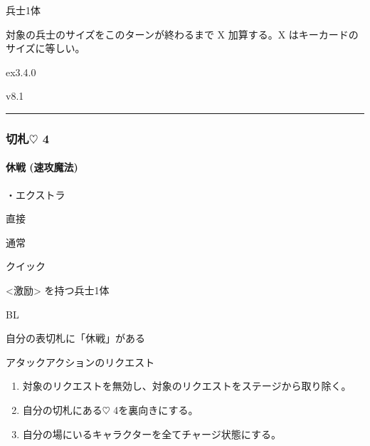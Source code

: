 \documentclass[letterpaper,10pt,dvipdfmx]{sphinxmanual}
\begin{document}
\sphinxAtStartPar
兵士1体

\sphinxAtStartPar
{}

\sphinxAtStartPar
対象の兵士のサイズをこのターンが終わるまで X 加算する。X はキーカードのサイズに等しい。

\sphinxAtStartPar
{}  ex3.4.0

\sphinxAtStartPar
{}  v8.1


\bigskip\hrule\bigskip



\subsubsection{切札{\normalsize $\heartsuit$} 4}
\label{\detokenize{auto/frameActionlist:id37}}

\paragraph{休戦 (速攻魔法)}
\label{\detokenize{auto/frameActionlist:act-retreat}}\label{\detokenize{auto/frameActionlist:id38}}
\sphinxAtStartPar
{}

\sphinxAtStartPar
・エクストラ

\sphinxAtStartPar
{} 直接

\sphinxAtStartPar
{} 通常

\sphinxAtStartPar
{} クイック

\sphinxAtStartPar
{} \textless{}激励\textgreater{} を持つ兵士1体

\sphinxAtStartPar
{} BL

\sphinxAtStartPar
{}

\sphinxAtStartPar
自分の表切札に「休戦」がある

\sphinxAtStartPar
{}

\sphinxAtStartPar
アタックアクションのリクエスト

\sphinxAtStartPar
{}
\begin{enumerate}
%
\item {} 
\sphinxAtStartPar
対象のリクエストを無効し、対象のリクエストをステージから取り除く。

\item {} 
\sphinxAtStartPar
自分の切札にある{\normalsize $\heartsuit$} 4を裏向きにする。

\item {} 
\sphinxAtStartPar
自分の場にいるキャラクターを全てチャージ状態にする。

\end{enumerate}
\end{document}
